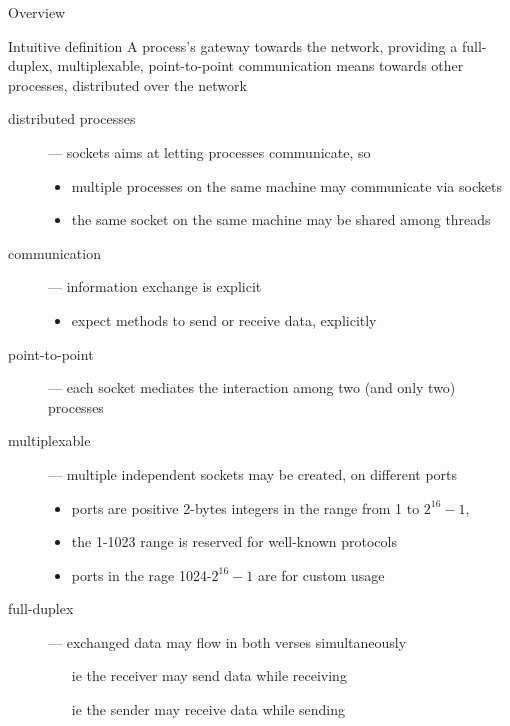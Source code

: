 \documentclass[presentation]{beamer}\mode<presentation>{\usetheme{AMSBolognaFC}}
\begin{document}
\begin{frame}[c, allowframebreaks]{Overview}
    \begin{block}{Intuitive definition}
        A process's gateway towards the network, providing a full-duplex, multiplexable, point-to-point communication means towards other processes, distributed over the network
    \end{block}

    \begin{description}
        \item[distributed processes] --- sockets aims at letting \alert{processes} communicate, so
        \begin{itemize}\small
            \item multiple processes on the same machine may communicate via sockets
            \item the same socket on the same machine may be shared among threads
        \end{itemize}

        \smallskip

        \item[communication] --- information exchange is \alert{explicit}
        \begin{itemize}\small
            \item expect methods to send or receive data, explicitly
        \end{itemize}

        \smallskip

        \item[point-to-point] --- each socket mediates the interaction among \alert{two (and only two)} processes

        \smallskip

        \item[multiplexable] --- multiple independent sockets may be created, on different \alert{ports}
        \begin{itemize}\small
            \item ports are positive 2-bytes integers in the range from 1 to $2^{16}-1$,
            \item the 1-1023 range is reserved for well-known protocols
            \item ports in the rage 1024-$2^{16}-1$ are for custom usage
        \end{itemize}

        \smallskip

        \item[full-duplex] --- exchanged data may flow in both verses simultaneously
        \begin{itemize}\small
            \item[ie] the receiver may send data while receiving
            \item[ie] the sender may receive data while sending
        \end{itemize}


\end{description}
\end{frame}
\end{document}
